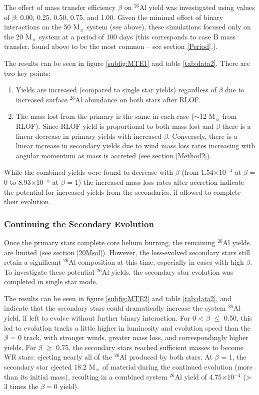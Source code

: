 The effect of mass transfer efficiency $\beta$ on $^{26}$Al yield was investigated using values of $\beta$: 0.00, 0.25, 0.50, 0.75, and 1.00.
Given the minimal effect of binary interactions on the 50 M$_{\sun}$ system (see above), these simulations focused only on the 20 M$_{\sun}$ system at a period of 100 days (this corresponds to case B mass transfer, found above to be the most common -- see section \ref{Period}.).

The results can be seen in figure \ref{subfig:MTE1} and table \ref{tab:data2}.
There are two key points:
\begin{enumerate}
    \item Yields are increased (compared to single star yields) regardless of $\beta$ due to increased surface $^{26}$Al abundance on both stars after RLOF.
    \item The mass lost from the primary is the same in each case ($\sim$12 M$_{\sun}$ from RLOF). Since RLOF yield is proportional to both mass lost and $\beta$ there is a linear decrease in primary yields with increased $\beta$. Conversely, there is a linear increase in secondary yields due to wind mass loss rates increasing with angular momentum as mass is accreted (see section \ref{Method2}).
\end{enumerate}

While the combined yields were found to decrease with $\beta$ (from 1.54$\times$10$^{-4}$ at $\beta$ = 0 to 8.93$\times$10$^{-5}$ at $\beta$ = 1) the increased mass loss rates after accretion indicate the potential for increased yields from the secondaries, if allowed to complete their evolution.

\subsubsection{Continuing the Secondary Evolution} \label{Secondaries}
Once the primary stars complete core helium burning, the remaining $^{26}$Al yields are limited (see section \ref{20Msol}).
However, the less-evolved secondary stars still retain a significant $^{26}$Al composition at this time, especially in cases with high $\beta$.
To investigate these potential $^{26}$Al yields, the secondary star evolution was completed in single star mode.

The results can be seen in figure \ref{subfig:MTE2} and table \ref{tab:data2}, and indicate that the secondary stars could dramatically increase the system $^{26}$Al yield, if left to evolve without further binary interaction.
For 0 < $\beta$ $\leq$ 0.50, this led to evolution tracks a little higher in luminosity and evolution speed than the $\beta$ = 0 track, with stronger winds, greater mass loss, and correspondingly higher yields.
For $\beta$ $\geq$ 0.75, the secondary stars reached sufficient masses to become WR stars: ejecting nearly all of the $^{26}$Al produced by both stars.
At $\beta$ = 1, the secondary star ejected 18.2 M$_{\sun}$ of material during the continued evolution (more than its initial mass), resulting in a combined system $^{26}$Al yield of 4.75$\times$10$^{-4}$ (> 3 times the $\beta=0$ yield).